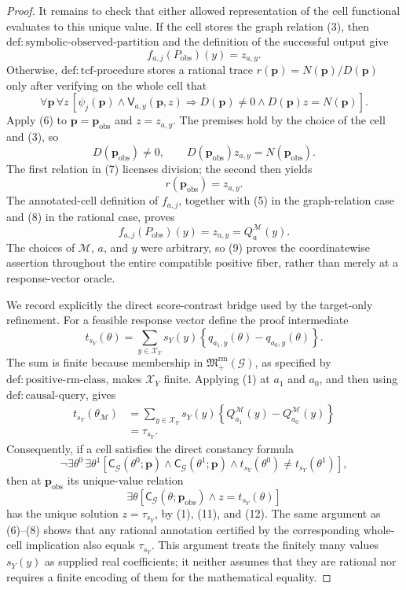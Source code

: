 \documentclass{article}
\begin{document}
\begin{proof}
It remains to check that either allowed representation of the cell functional evaluates to this unique value.  If the cell stores the graph relation (3), then
\(\mathrm{def{:}symbolic\text{-}observed\text{-}partition}\) and the definition of the successful output give
\[
f_{a,j}(P_{\mathrm{obs}})(y)=z_{a,y}.
\tag{5}
\]
Otherwise, \(\mathrm{def{:}tcf\text{-}procedure}\) stores a rational trace
\(r(\mathbf p)=N(\mathbf p)/D(\mathbf p)\) only after verifying on the whole cell that
\[
\forall\mathbf p\,\forall z\,
\left[
\psi_j(\mathbf p)\wedge\mathsf V_{a,y}(\mathbf p,z)
\Longrightarrow
D(\mathbf p)\ne0\wedge D(\mathbf p)z=N(\mathbf p)
\right].
\tag{6}
\]
Apply (6) to \(\mathbf p=\mathbf p_{\mathrm{obs}}\) and \(z=z_{a,y}\).  The premises hold by the choice of the cell and (3), so
\[
D(\mathbf p_{\mathrm{obs}})\ne0,
\qquad
D(\mathbf p_{\mathrm{obs}})z_{a,y}=N(\mathbf p_{\mathrm{obs}}).
\tag{7}
\]
The first relation in (7) licenses division; the second then yields
\[
r(\mathbf p_{\mathrm{obs}})=z_{a,y}.
\tag{8}
\]
The annotated-cell definition of \(f_{a,j}\), together with (5) in the graph-relation case and (8) in the rational case, proves
\[
f_{a,j}(P_{\mathrm{obs}})(y)
=z_{a,y}
=Q_a^{\mathcal M}(y).
\tag{9}
\]
The choices of \(\mathcal M\), \(a\), and \(y\) were arbitrary, so (9) proves the coordinatewise assertion throughout the entire compatible positive fiber, rather than merely at a response-vector oracle.

We record explicitly the direct score-contrast bridge used by the target-only refinement.  For a feasible response vector define the proof intermediate
\[
t_{s_Y}(\theta)
=\sum_{y\in\mathcal X_Y}s_Y(y)
\left\{q_{a_1,y}(\theta)-q_{a_0,y}(\theta)\right\}.
\tag{10}
\]
The sum is finite because membership in \(\mathfrak M_{+}^{\mathrm{rm}}(\mathcal G)\), as specified by \(\mathrm{def{:}positive\text{-}rm\text{-}class}\), makes \(\mathcal X_Y\) finite.  Applying (1) at \(a_1\) and \(a_0\), and then using \(\mathrm{def{:}causal\text{-}query}\), gives
\[
\begin{aligned}
t_{s_Y}(\theta_{\mathcal M})
&=\sum_{y\in\mathcal X_Y}s_Y(y)
\left\{Q_{a_1}^{\mathcal M}(y)-Q_{a_0}^{\mathcal M}(y)\right\}\\
&=\tau_{s_Y}.
\end{aligned}
\tag{11}
\]
Consequently, if a cell satisfies the direct constancy formula
\[
\neg\exists\theta^0\,\exists\theta^1
\left[
\mathsf C_{\mathcal G}(\theta^0;\mathbf p)
\wedge
\mathsf C_{\mathcal G}(\theta^1;\mathbf p)
\wedge
t_{s_Y}(\theta^0)\ne t_{s_Y}(\theta^1)
\right],
\tag{12}
\]
then at \(\mathbf p_{\mathrm{obs}}\) its unique-value relation
\[
\exists\theta\left[
\mathsf C_{\mathcal G}(\theta;\mathbf p_{\mathrm{obs}})
\wedge z=t_{s_Y}(\theta)
\right]
\tag{13}
\]
has the unique solution \(z=\tau_{s_Y}\), by (1), (11), and (12).  The same argument as (6)--(8) shows that any rational annotation certified by the corresponding whole-cell implication also equals \(\tau_{s_Y}\).  This argument treats the finitely many values \(s_Y(y)\) as supplied real coefficients; it neither assumes that they are rational nor requires a finite encoding of them for the mathematical equality.


\end{proof}
\end{document}
